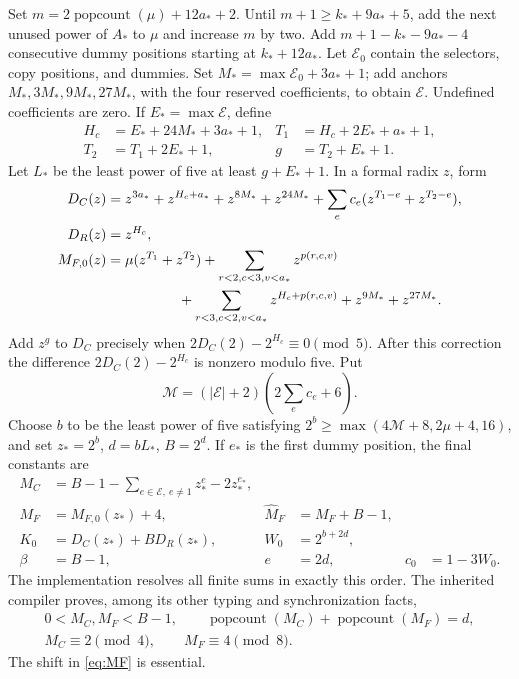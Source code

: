 \documentclass[11pt]{article}
\theoremstyle{remark}\newtheorem{remark}[theorem]{Remark}
\newcommand{\pc}{\operatorname{popcount}}\newcommand{\bl}{\operatorname{bitlength}}
\begin{document}
Set $m=2\pc(\mu)+12a_*+2$. Until
$m+1\ge k_*+9a_*+5$, add the next unused power of $A_*$ to
$\mu$ and increase $m$ by two. Add
$m+1-k_*-9a_*-4$ consecutive dummy positions starting at
$k_*+12a_*$. Let $\mathcal E_0$ contain the selectors, copy
positions, and dummies. Set $M_* =\max\mathcal E_0+3a_*+1$;
add anchors $M_*,3M_*,9M_*,27M_*$, with the four reserved
coefficients, to obtain $\mathcal E$. Undefined coefficients are zero.
If $E_* =\max\mathcal E$, define
\begin{align*}
 H_c&=E_*+24M_*+3a_*+1,& T_1&=H_c+2E_*+a_*+1,\\
 T_2&=T_1+2E_*+1,&g&=T_2+E_*+1.
\end{align*}
Let $L_*$ be the least power of five at least $g+E_*+1$.
In a formal radix $z$, form
\begin{align*}
 D_C(z)&=z^{3a_*}+z^{H_c+a_*}+z^{8M_*}+z^{24M_*}
       +\sum_e c_e(z^{T_1-e}+z^{T_2-e}),\\
 D_R(z)&=z^{H_c},\\
 M_{F,0}(z)&=\mu(z^{T_1}+z^{T_2})
  +\sum_{r<2,c<3,v<a_*}z^{p(r,c,v)}\\
 &\hspace{18mm}+\sum_{r<3,c<2,v<a_*}z^{H_c+p(r,c,v)}
  +z^{9M_*}+z^{27M_*}.
\end{align*}
Add $z^g$ to $D_C$ precisely when
$2D_C(2)-2^{H_c}\equiv0\pmod5$. After this correction the
difference $2D_C(2)-2^{H_c}$ is nonzero modulo five. Put
\[
 \mathcal M=(|\mathcal E|+2)\left(2\sum_e c_e+6\right).
\]
Choose $b$ to be the least power of five satisfying
$2^b\ge\max(4\mathcal M+8,2\mu+4,16)$, and set
$z_*=2^b$, $d=bL_*$, $B=2^d$. If $e_*$ is the first dummy
position, the final constants are
\begin{align}
 M_C&=B-1-\sum_{e\in\mathcal E,\ e\ne1}z_*^e-2z_*^{e_*},\label{eq:MC}\\
 M_F&=M_{F,0}(z_*)+4, &\widehat M_F&=M_F+B-1,\label{eq:MF}\\
 K_0&=D_C(z_*)+B D_R(z_*),&W_0&=2^{b+2d},\label{eq:K0}\\
 \beta&=B-1,&e&=2d,&c_0&=1-3W_0.\label{eq:c0}
\end{align}
The implementation resolves all finite sums in exactly this order.
The inherited compiler proves, among its other typing and
synchronization facts,
\begin{gather*}
 0<M_C,M_F<B-1,\qquad \pc(M_C)+\pc(M_F)=d,\\
 M_C\equiv2\pmod4,\qquad M_F\equiv4\pmod8.
\end{gather*}
The shift in \eqref{eq:MF} is essential.
\end{document}
